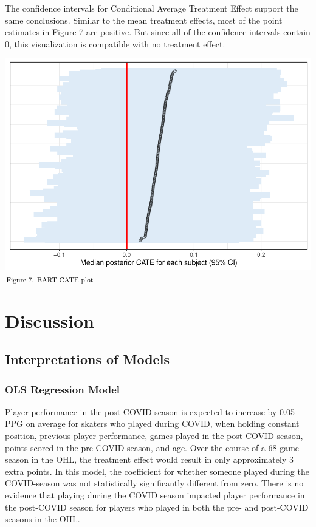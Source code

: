 \documentclass[12pt]{article}
\begin{document}
The confidence intervals for Conditional Average Treatment Effect
support the same conclusions. Similar to the mean treatment effects,
most of the point estimates in Figure 7 are positive. But since all of
the confidence intervals contain 0, this visualization is compatible
with no treatment effect.

\includegraphics{journal-article_files/figure-latex/bart-cates-1.pdf}
\(\hspace*{\fill} \footnotesize \text{Figure 7. BART CATE plot}\)

\hypertarget{discussion}{%
\section{Discussion}\label{discussion}}

\hypertarget{interpretations-of-models}{%
\subsection{Interpretations of Models}\label{interpretations-of-models}}

\hypertarget{ols-regression-model}{%
\subsubsection{OLS Regression Model}\label{ols-regression-model}}

Player performance in the post-COVID season is expected to increase by
0.05 PPG on average for skaters who played during COVID, when holding
constant position, previous player performance, games played in the
post-COVID season, points scored in the pre-COVID season, and age. Over
the course of a 68 game season in the OHL, the treatment effect would
result in only approximately 3 extra points. In this model, the
coefficient for whether someone played during the COVID-season was not
statistically significantly different from zero. There is no evidence
that playing during the COVID season impacted player performance in the
post-COVID season for players who played in both the pre- and post-COVID
seasons in the OHL.
\end{document}
